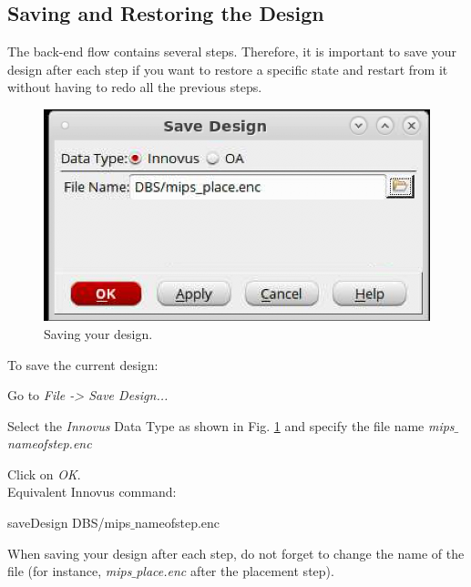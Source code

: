 \subsection{Saving and Restoring the Design}\label{save}
The back-end flow contains several steps. Therefore, it is important to save your design after each step if you want to restore a specific state and restart from it without having to redo all the previous steps.

\begin{enumerate}
	\parbox[t]{\dimexpr\textwidth-\leftmargin}{%
		\begin{figure}
			\vspace{0mm}
			\centering
			\vspace{-\baselineskip}
			\includegraphics[scale=0.35]{figures/lab5_backend/save_design}
			\caption{Saving your design.}
			\label{fig_save_design}
		\end{figure}
	To save the current design:
		\vspace{-4mm}
		\item Go to \textit{File -> Save Design...}
		\item Select the \textit{Innovus} Data Type as shown in Fig. \ref{fig_save_design} and specify the file name \textit{mips$\_$nameofstep.enc}
		\item Click on \textit{OK}.  \\ 
		Equivalent Innovus command:
		\begin{codeline}
			saveDesign DBS/mips$\_$nameofstep.enc
		\end{codeline}
		
	}
\end{enumerate}


		\vspace{-9mm}
\begin{remark}
	When saving your design after each step, do not forget to change the name of the file (for instance, \textit{mips$\_$place.enc} after the placement step).
\end{remark}

